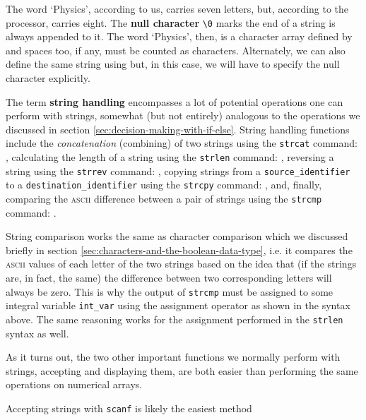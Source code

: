 \documentclass[11pt,oneside]{article}
\begin{document}
{{{{{{{{{The word `Physics', according to us, carries seven letters, but, according to the processor, carries eight. The \textbf{null character} \verb+\0+ marks the end of a string is always appended to it. The word `Physics', then, is a character array defined by  and spaces too, if any, must be counted as characters. Alternately, we can also define the same string using  but, in this case, we will have to specify the null character explicitly.

The term \textbf{string handling} encompasses a lot of potential operations one can perform with strings, somewhat (but not entirely) analogous to the operations we discussed in section \ref{sec:decision-making-with-if-else}. String handling functions include the \textit{concatenation} (combining) of two strings using the \verb+strcat+ command: , calculating the length of a string using the \verb+strlen+ command: , reversing a string using the \verb+strrev+ command: , copying strings from a \verb+source_identifier+ to a \verb+destination_identifier+ using the \verb+strcpy+ command: , and, finally, comparing the \textsc{ascii} difference between a pair of strings using the \verb+strcmp+ command: .

String comparison works the same as character comparison which we discussed briefly in section \ref{sec:characters-and-the-boolean-data-type}, i.e. it compares the \textsc{ascii} values of each letter of the two strings based on the idea that (if the strings are, in fact, the same) the difference between two corresponding letters will always be zero. This is why the output of \verb+strcmp+ must be assigned to some integral variable \verb+int_var+ using the assignment operator as shown in the syntax above. The same reasoning works for the assignment performed in the \verb+strlen+ syntax as well.

As it turns out, the two other important functions we normally perform with strings, accepting and displaying them, are both easier than performing the same operations on numerical arrays.

Accepting strings with \verb+scanf+ is likely the easiest method \cbox{scanf ( "%

}}}}}}}}}}
\end{document}
